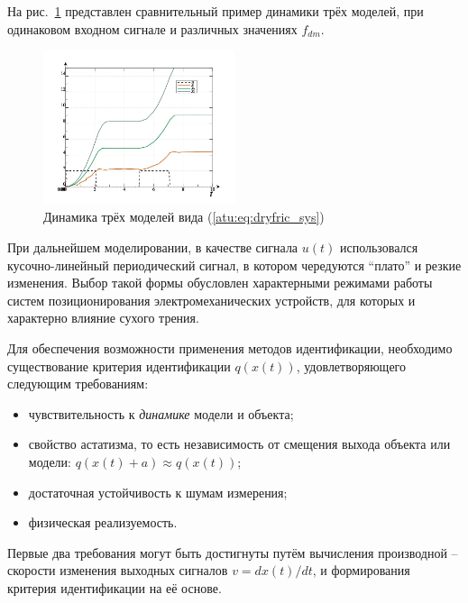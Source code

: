 На рис.~\ref{atu:f:fric_outs} представлен сравнительный пример динамики трёх
моделей, при одинаковом входном сигнале
и различных значениях $f_{dm}$.

\begin{figure}[htb!]
  \centerline{
    \includegraphics[width=0.5\textwidth]{p/cha/fric/fric_outs.png}
  }
  \caption{Динамика трёх моделей вида (\ref{atu:eq:dryfric_sys})}
  \label{atu:f:fric_outs}
\end{figure}

При дальнейшем моделировании, в качестве сигнала $u(t)$ использовался кусочно-линейный периодический сигнал,
в котором чередуются ``плато'' и резкие изменения. Выбор такой формы обусловлен
характерными режимами работы систем позиционирования электромеханических
устройств, для которых и характерно влияние сухого трения.

Для обеспечения возможности применения методов идентификации,
необходимо существование критерия идентификации
\( q(x(t)) \),
удовлетворяющего следующим требованиям:

\begin{itemize}

\item
чувствительность к \textit{динамике} модели и объекта;

\item
свойство астатизма, то есть
независимость
от смещения выхода объекта или модели:
\( q(x(t)+a ) \approx q( x(t) ) \);

\item
достаточная устойчивость к шумам измерения;

\item
физическая реализуемость.

\end{itemize}

Первые два требования
могут быть достигнуты путём вычисления производной --
скорости изменения выходных сигналов
\(v = dx(t)/dt \),
и формирования критерия идентификации на её основе.

